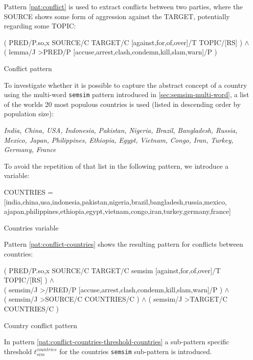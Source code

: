 \documentclass[11pt]{scrreprt}
\begin{document}
Pattern \ref{pat:conflict} is used to extract conflicts between two parties, where the \textsf{SOURCE} shows some form of aggression against the \textsf{TARGET}, potentially regarding some \textsf{TOPIC}:

\begin{pattern}
  \normalfont\sffamily
  \centering
  ( PRED/P.{so,x} SOURCE/C TARGET/C [against,for,of,over]/T TOPIC/[RS] ) \(\wedge\)\\ ( lemma/J >PRED/P [accuse,arrest,clash,condemn,kill,slam,warn]/P )
  \caption{Conflict pattern}
  \label{pat:conflict}
\end{pattern}



To investigate whether it is possible to capture the abstract concept of a country using the multi-word \texttt{semsim} pattern introduced in \ref{sec:semsim-multi-word}, a list of the worlds 20 most populous countries \cite{wiki_list_of_countries} is used (listed in descending order by population size):


\textit{India, China, USA, Indonesia, Pakistan, Nigeria, Brazil, Bangladesh, Russia, Mexico, Japan, Philippines, Ethiopia, Egypt, Vietnam, Congo, Iran, Turkey, Germany, France}

To avoid the repetition of that list in the following pattern, we introduce a variable:

\begin{pattern}
  \normalfont\sffamily
  \centering
  COUNTRIES = [india,china,usa,indonesia,pakistan,nigeria,brazil,bangladesh,russia,mexico, ajapan,philippines,ethiopia,egypt,vietnam,congo,iran,turkey,germany,france]
  \caption{Countries variable}
  \label{pat:countries-var}
\end{pattern}

Pattern \ref{pat:conflict-countries} shows the resulting pattern for conflicts between countries:

\begin{pattern}
  \normalfont\sffamily
  \centering
  ( PRED/P.{so,x} SOURCE/C TARGET/C semsim [against,for,of,over]/T TOPIC/[RS] ) \(\wedge\) \\ 
  ( semsim/J >/PRED/P [accuse,arrest,clash,condemn,kill,slam,warn]/P ) \(\wedge\) \\
  ( semsim/J >SOURCE/C COUNTRIES/C ) \(\wedge\) ( semsim/J >TARGET/C COUNTRIES/C )
  \caption{Country conflict pattern}
  \label{pat:conflict-countries}
\end{pattern}

In pattern \ref{pat:conflict-countries-threshold-countries} a sub-pattern specific threshold \(t_{sim}^{countries}\) for the countries \texttt{semsim} sub-pattern is introduced.
\end{document}

